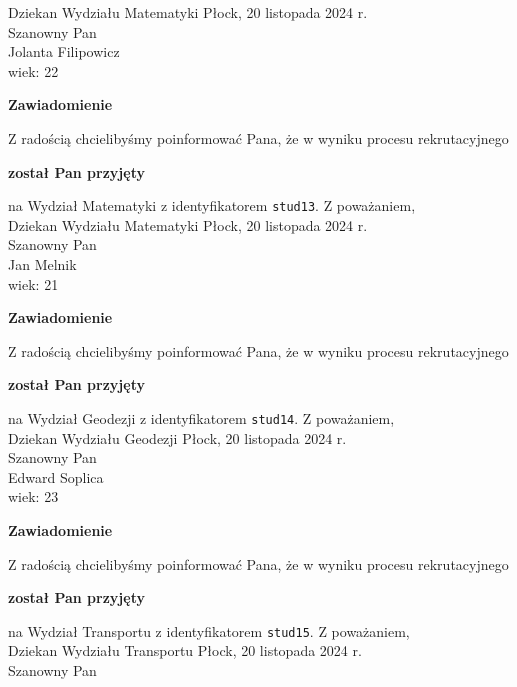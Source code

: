 \documentclass[12pt,a4paper]{article}
\begin{document}
Dziekan
Wydziału Matematyki
\newpage
\hfill Płock, 20 listopada 2024 r.\\
\noindent 
Szanowny Pan \\
Jolanta Filipowicz \\
wiek: 22
\bigskip
\begin{center}
 	{\Large\textbf{Zawiadomienie}}
\end{center}
\bigskip
Z radością chcielibyśmy poinformować Pana, że w wyniku procesu rekrutacyjnego 
\begin{center}
\textsf{\textbf{został Pan przyjęty}} 
\end{center}
na Wydział Matematyki z identyfikatorem \verb|stud13|. 
\vspace{2cm}
\noindent
Z poważaniem,\\
Dziekan
Wydziału Matematyki
\newpage
\hfill Płock, 20 listopada 2024 r.\\
\noindent 
Szanowny Pan \\
Jan Melnik \\
wiek: 21
\bigskip
\begin{center}
 	{\Large\textbf{Zawiadomienie}}
\end{center}
\bigskip
Z radością chcielibyśmy poinformować Pana, że w wyniku procesu rekrutacyjnego 
\begin{center}
\textsf{\textbf{został Pan przyjęty}} 
\end{center}
na Wydział Geodezji z identyfikatorem \verb|stud14|. 
\vspace{2cm}
\noindent
Z poważaniem,\\
Dziekan
Wydziału Geodezji
\newpage
\hfill Płock, 20 listopada 2024 r.\\
\noindent 
Szanowny Pan \\
Edward Soplica \\
wiek: 23
\bigskip
\begin{center}
 	{\Large\textbf{Zawiadomienie}}
\end{center}
\bigskip
Z radością chcielibyśmy poinformować Pana, że w wyniku procesu rekrutacyjnego 
\begin{center}
\textsf{\textbf{został Pan przyjęty}} 
\end{center}
na Wydział Transportu z identyfikatorem \verb|stud15|. 
\vspace{2cm}
\noindent
Z poważaniem,\\
Dziekan
Wydziału Transportu
\newpage
\hfill Płock, 20 listopada 2024 r.\\
\noindent 
Szanowny Pan \\
\end{document}

